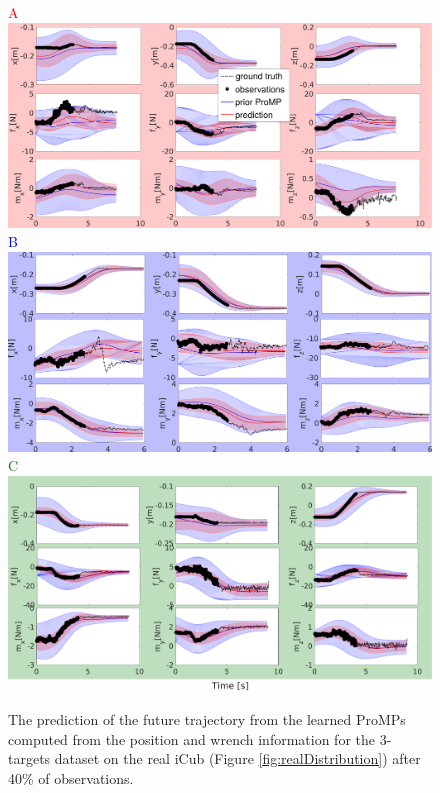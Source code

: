 \documentclass[utf8]{frontiersSCNS} %
\newcommand{\todo}[1]{\textcolor{red}{\textbf{/*#1*/}}}
\begin{document}

\begin{figure}[!h]
\centering
{
\textcolor{red}{A}\\
\includegraphics[width=14cm]{img/withWrenchInfA.pdf}\\
\textcolor{blue}{B}\\
\includegraphics[width=14cm]{img/withWrenchInfB.pdf}\\
\textcolor{green}{C}\\
\includegraphics[width=14cm]{img/withWrenchInfC.pdf}\\
}
\caption{The prediction of the future trajectory from the learned ProMPs computed from the position and wrench information for the 3-targets dataset on the real iCub (Figure \ref{fig:realDistribution}) after 40\% of observations.}
\label{fig:realTrajectoriesPredictionsWithForces}
\end{figure}
\end{document}
